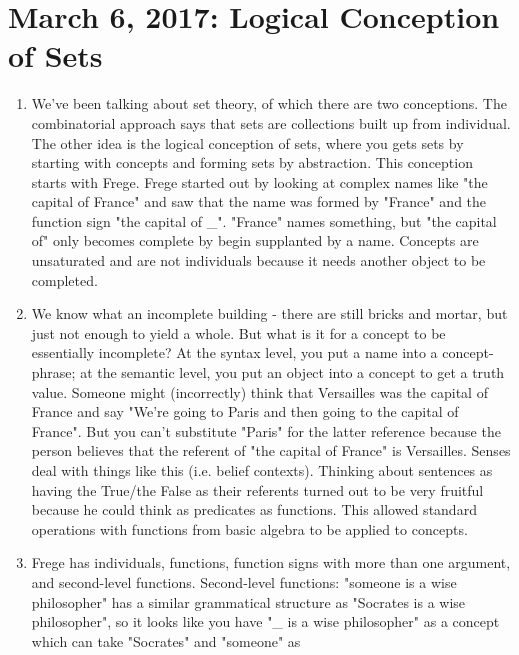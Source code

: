 \documentclass[12pt]{article}
\theoremstyle{definition}
\begin{document}
\section{March 6, 2017: Logical Conception of Sets}

\begin{enumerate}
    \itemsep0em 
    \item
        We've been talking about set theory, of which there are two
        conceptions. The combinatorial approach says that sets are collections
        built up from individual. The other idea is the logical conception of
        sets, where you gets sets by starting with concepts and forming sets by
        abstraction. This conception starts with Frege. Frege started out by
        looking at complex names like "the capital of France" and saw that the
        name was formed by "France" and the function sign "the capital of \_".
        "France" names something, but "the capital of" only becomes complete by
        begin supplanted by a name. Concepts are unsaturated and are not
        individuals because it needs another object to be completed. 
    \item
        We know what an incomplete building - there are still bricks and
        mortar, but just not enough to yield a whole. But what is it for a
        concept to be essentially incomplete? At the syntax level, you put a
        name into a concept-phrase; at the semantic level, you put an object
        into a concept to get a truth value. Someone might (incorrectly) think
        that Versailles was the capital of France and say "We're going to Paris
        and then going to the capital of France". But you can't substitute
        "Paris" for the latter reference because the person believes that the
        referent of "the capital of France" is Versailles. Senses deal with
        things like this (i.e. belief contexts). Thinking about sentences as
        having the True/the False as their referents turned out to be very
        fruitful because he could think as predicates as functions. This
        allowed standard operations with functions from basic algebra to be
        applied to concepts.
    \item
        Frege has individuals, functions, function signs with more than one
        argument, and second-level functions. Second-level functions: "someone
        is a wise philosopher" has a similar grammatical structure as "Socrates
        is a wise philosopher", so it looks like you have "\_ is a wise
        philosopher" as a concept which can take "Socrates" and "someone" as

\end{enumerate}
\end{document}
